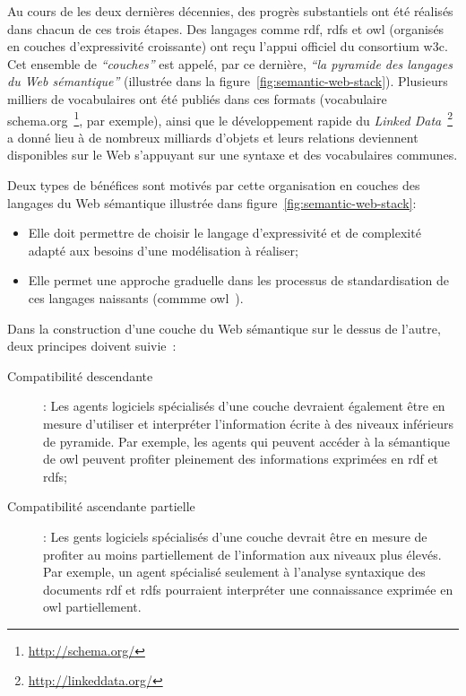 

Au cours de les deux dernières décennies, des progrès substantiels ont
été réalisés dans chacun de ces trois étapes. Des langages comme
\acrshort{rdf}, \acrshort{rdfs} et \acrshort{owl} (organisés en
couches d'expressivité croissante) ont reçu l'appui officiel du
consortium \acrshort{w3c}. Cet ensemble de \emph{``couches''} est
appelé, par ce dernière, \emph{``la pyramide des langages du Web
  sémantique''} (illustrée dans la
figure~\ref{fig:semantic-web-stack}). Plusieurs milliers de
vocabulaires ont été publiés dans ces formats (vocabulaire
schema.org~\footnote{\url{http://schema.org/}}, par exemple), ainsi
que le développement rapide du \emph{Linked
  Data}~\footnote{\url{http://linkeddata.org/}} a donné lieu à de
nombreux milliards d'objets et leurs relations deviennent disponibles
sur le Web s'appuyant sur une syntaxe et des vocabulaires communes.

Deux types de bénéfices sont motivés par cette organisation en couches
des langages du Web sémantique illustrée dans
figure~\ref{fig:semantic-web-stack}:\medskip

\SpecialItem
\begin{itemize}
\item Elle doit permettre de choisir le langage d'expressivité et de
  complexité adapté aux besoins d'une modélisation à réaliser;\medskip

\item Elle permet une approche graduelle dans les processus de
  standardisation de ces langages naissants (commme
  \acrshort{owl}~\cite{mcguinness2004owl}).\medskip
\end{itemize}
\enddescription

Dans la construction d'une couche du Web sémantique sur le dessus de
l'autre, deux principes doivent suivie~\cite{antoniou2012semantic}:

\renewcommand{\descriptionlabel}[1]{\hspace{0.5cm}\textbullet~\textsf{#1}}
\begin{description}
\item[Compatibilité descendante]: Les agents logiciels spécialisés
  d'une couche devraient également être en mesure d'utiliser et
  interpréter l'information écrite à des niveaux inférieurs de
  pyramide. Par exemple, les agents qui peuvent accéder à la
  sémantique de \acrshort{owl} peuvent profiter pleinement des
  informations exprimées en \acrshort{rdf} et \acrshort{rdfs};

\item[Compatibilité ascendante partielle ]: Les gents logiciels
  spécialisés d'une couche devrait être en mesure de profiter au moins
  \textsf{partiellement} de l'information aux niveaux plus élevés. Par
  exemple, un agent spécialisé seulement à l'analyse syntaxique des
  documents \acrshort{rdf} et \acrshort{rdfs} pourraient interpréter
  une connaissance exprimée en \acrshort{owl} partiellement.
\end{description}
\enddescription

